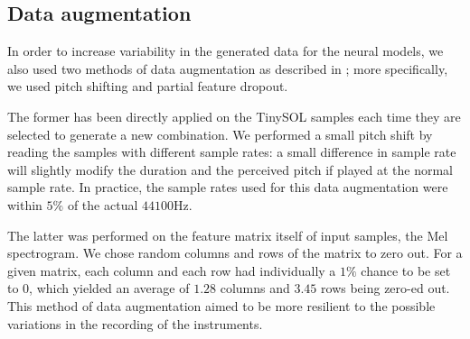 \documentclass{article}
\begin{document}

\subsection{Data augmentation}

In order to increase variability in the generated data for the neural models, we also used two methods of data augmentation as described in \cite{Salamon17, Bhardwaj17}; more specifically, we used pitch shifting and partial feature dropout.

The former has been directly applied on the TinySOL samples each time they are selected to generate a new combination. We performed a small pitch shift by reading the samples with different sample rates: a small difference in sample rate will slightly modify the duration and the perceived pitch if played at the normal sample rate. In practice, the sample rates used for this data augmentation were within $5\%$ of the actual $44100$Hz.

The latter was performed on the feature matrix itself of input samples, the Mel spectrogram. We chose random columns and rows of the matrix to zero out. For a given matrix, each column and each row had individually a $1\%$ chance to be set to 0, which yielded an average of $1.28$  columns and $3.45$ rows being zero-ed out. This method of data augmentation aimed to be more resilient to the possible variations in the recording of the instruments.
\end{document}
